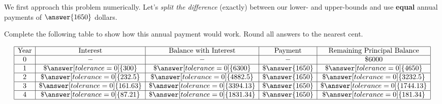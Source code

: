 \documentclass[handout,space,nooutcomes]{ximera}
\begin{document}
\newpage
\begin{question}[1in]
We first approach this problem numerically.  Let's \emph{split the difference} (exactly) between our lower- and upper-bounds and use  
\textbf{equal} annual payments of $\answer{1650}$ dollars.  

Complete the following table to show how this annual payment would work.  Round all answers to the nearest cent.


\[
  \begin{array}{|c|c|c|c|c|}
    \hline
    \text{Year} & \text{Interest}             & \text{Balance with Interest} & \text{Payment}    & \text{Remaining Principal Balance}\\ \hline
    0  &  -               & -                  &  -     & \$ 6000 \\ \hline
    1  & \$ \answer[tolerance=0]{300}    & \$ \answer[tolerance=0]{6300}    & \$ \answer{1650}  & \$ \answer[tolerance=0]{4650} \\ \hline
    2  & \$ \answer[tolerance=0]{232.5}    & \$ \answer[tolerance=0]{4882.5}    & \$ \answer{1650}  & \$ \answer[tolerance=0]{3232.5} \\ \hline
    3  & \$ \answer[tolerance=0]{161.63} & \$ \answer[tolerance=0]{3394.13} & \$ \answer{1650}  & \$ \answer[tolerance=0]{1744.13} \\ \hline
    4  & \$ \answer[tolerance=0]{87.21} & \$ \answer[tolerance=0]{1831.34} & \$ \answer{1650}  & \$ \answer[tolerance=0]{181.34} \\ \hline
  \end{array}
\]

\end{question}
\end{document}
